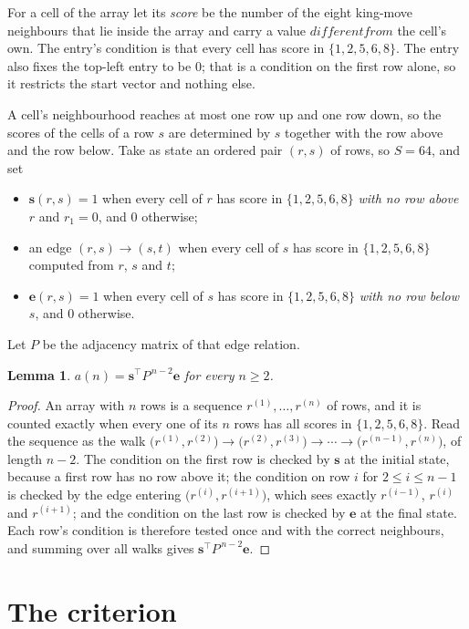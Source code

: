 \documentclass[11pt,a4paper]{article}
\theoremstyle{plain}
\newtheorem{lemma}[theorem]{Lemma}
\theoremstyle{definition}
\begin{document}
For a cell of the array let its \emph{score} be the number of the eight king-move neighbours that lie inside
the array and carry a value $different from$ the cell's own. The entry's condition is that every cell
has score in $\{1,2,5,6,8\}$. The entry also fixes the top-left entry to be $0$; that is a condition on the first row alone, so it restricts the start vector and nothing else.

A cell's neighbourhood reaches at most one row up and one row down, so the scores of the
cells of a row $s$ are determined by $s$ together with the row above and the row below.
Take as state an ordered pair $(r,s)$ of rows, so $S=64$, and set
\begin{itemize}
\item $\mathbf{s}(r,s)=1$ when every cell of $r$ has score in $\{1,2,5,6,8\}$ \emph{with no row
above $r$} and $r_1=0$, and $0$ otherwise;
\item an edge $(r,s)\to(s,t)$ when every cell of $s$ has score in $\{1,2,5,6,8\}$ computed from
$r$, $s$ and $t$;
\item $\mathbf{e}(r,s)=1$ when every cell of $s$ has score in $\{1,2,5,6,8\}$ \emph{with no row
below $s$}, and $0$ otherwise.
\end{itemize}
Let $P$ be the adjacency matrix of that edge relation.

\begin{lemma}\label{lem:walk}
$a(n)=\mathbf{s}^{\!\top}P^{\,n-2}\mathbf{e}$ for every $n\ge2$.
\end{lemma}

\begin{proof}
An array with $n$ rows is a sequence $r^{(1)},\dots,r^{(n)}$ of rows, and it is counted
exactly when every one of its $n$ rows has all scores in $\{1,2,5,6,8\}$. Read the sequence as the
walk $\bigl(r^{(1)},r^{(2)}\bigr)\to\bigl(r^{(2)},r^{(3)}\bigr)\to\cdots\to
\bigl(r^{(n-1)},r^{(n)}\bigr)$, of length $n-2$. The condition on the first row is
checked by $\mathbf{s}$ at the initial state, because a first row has no row above it; the
condition on row $i$ for $2\le i\le n-1$ is checked by the edge entering
$\bigl(r^{(i)},r^{(i+1)}\bigr)$, which sees exactly $r^{(i-1)}$, $r^{(i)}$ and
$r^{(i+1)}$; and the condition on the last row is checked by $\mathbf{e}$ at the final
state. Each row's condition is therefore tested once and with the correct neighbours, and
summing over all walks gives $\mathbf{s}^{\!\top}P^{\,n-2}\mathbf{e}$.
\end{proof}

\section{The criterion}
\end{document}
